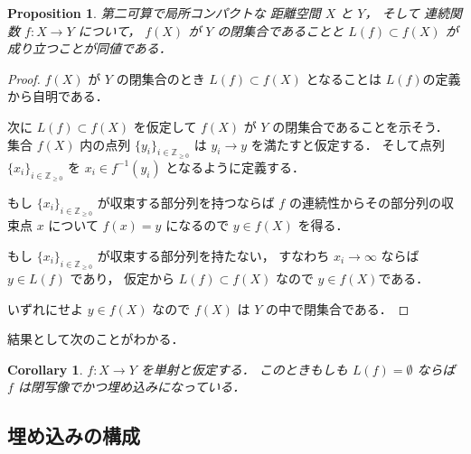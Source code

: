 \documentclass[leqno, a4paper, 12pt]{jsarticle}
\theoremstyle{plain}
\newtheorem{prop}[thm]{Proposition}
\newtheorem{cor}[thm]{Corollary}
\theoremstyle{definition}
\theoremstyle{remark}
\newcommand{\zz}{\mathbb{Z}}
\newcommand{\yolimset}[1]{L(#1)}
\numberwithin{equation}{section}
\begin{document}
\begin{prop}\label{hei}
第二可算で局所コンパクトな
距離空間
$X$
と
$Y$，
そして
連続関数
$f\colon X\to Y$
について，
$f(X)$
が
$Y$
の閉集合であることと
$\yolimset{f}\subset f(X)$
が成り立つことが同値である．
\end{prop}
\begin{proof}
$f(X)$
が
$Y$
の閉集合のとき
$\yolimset{f}\subset f(X)$
となることは
$\yolimset{f}$の定義から自明である．

次に
$\yolimset{f}\subset f(X)$
を仮定して
$f(X)$
が
$Y$
の閉集合であることを示そう．
集合
$f(X)$
内の点列
$\{y_{i}\}_{i\in \zz_{\ge 0}}$
は
$y_{i}\to y$
を満たすと仮定する．
そして点列
$\{x_{i}\}_{i\in \zz_{\ge 0}}$
を
$x_{i}\in f^{-1}(y_{i})$
となるように定義する．

もし
$\{x_{i}\}_{i\in \zz_{\ge 0}}$
が収束する部分列を持つならば
$f$
の連続性からその部分列の収束点
$x$
について
$f(x)=y$
になるので
$y\in f(X)$
を得る．



もし
$\{x_{i}\}_{i\in \zz_{\ge 0}}$
が収束する部分列を持たない，
すなわち
$x_{i}\to \infty$
ならば
$y\in \yolimset{f}$
であり，
仮定から
$\yolimset{f}\subset f(X)$
なので
$y\in f(X)$である．

いずれにせよ
$y\in f(X)$
なので
$f(X)$
は
$Y$
の中で閉集合である．
\end{proof}

結果として次のことがわかる．
\begin{cor}\label{cor:sum:keidaton8}
$f\colon X\to Y$
を単射と仮定する．
このときもしも
$\yolimset{f}=\emptyset$
ならば
$f$
は閉写像でかつ埋め込みになっている．
\end{cor}












\subsection{埋め込みの構成}\label{subsec:constemb}
\end{document}
